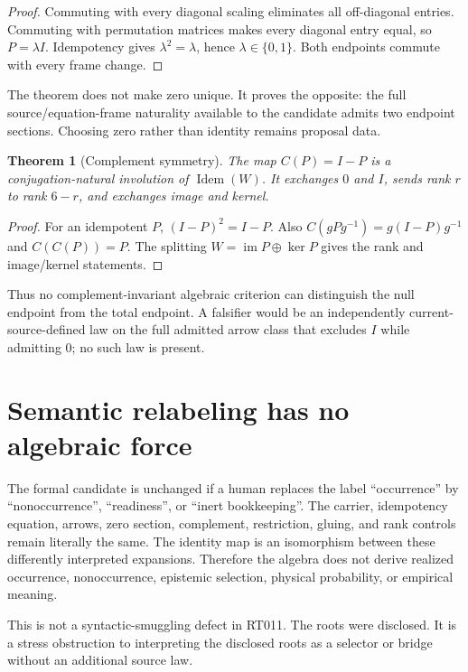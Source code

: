 \documentclass[11pt]{article}
\newtheorem{theorem}{Theorem}
\newcommand{\Idem}{\operatorname{Idem}}
\newcommand{\im}{\operatorname{im}}
\begin{document}
\begin{proof}
Commuting with every diagonal scaling eliminates all off-diagonal entries.
Commuting with permutation matrices makes every diagonal entry equal, so
$P=\lambda I$.  Idempotency gives $\lambda^2=\lambda$, hence
$\lambda\in\{0,1\}$.  Both endpoints commute with every frame change.
\end{proof}

The theorem does not make zero unique.  It proves the opposite: the full
source/equation-frame naturality available to the candidate admits two
endpoint sections.  Choosing zero rather than identity remains proposal data.

\begin{theorem}[Complement symmetry]
The map $C(P)=I-P$ is a conjugation-natural involution of $\Idem(W)$.  It
exchanges $0$ and $I$, sends rank $r$ to rank $6-r$, and exchanges image and
kernel.
\end{theorem}

\begin{proof}
For an idempotent $P$, $(I-P)^2=I-P$.  Also
$C(gPg^{-1})=g(I-P)g^{-1}$ and $C(C(P))=P$.  The splitting
$W=\im P\oplus\ker P$ gives the rank and image/kernel statements.
\end{proof}

Thus no complement-invariant algebraic criterion can distinguish the null
endpoint from the total endpoint.  A falsifier would be an independently
current-source-defined law on the full admitted arrow class that excludes
$I$ while admitting $0$; no such law is present.

\section{Semantic relabeling has no algebraic force}

The formal candidate is unchanged if a human replaces the label
``occurrence'' by ``nonoccurrence'', ``readiness'', or ``inert bookkeeping''.
The carrier, idempotency equation, arrows, zero section, complement,
restriction, gluing, and rank controls remain literally the same.  The
identity map is an isomorphism between these differently interpreted
expansions.  Therefore the algebra does not derive realized occurrence,
nonoccurrence, epistemic selection, physical probability, or empirical
meaning.

This is not a syntactic-smuggling defect in RT011.  The roots were disclosed.
It is a stress obstruction to interpreting the disclosed roots as a selector
or bridge without an additional source law.
\end{document}
